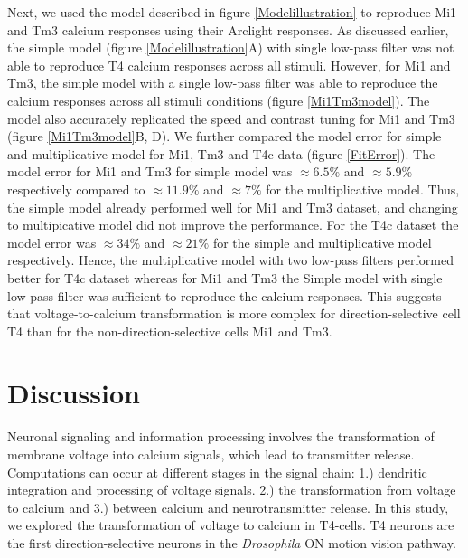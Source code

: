 \documentclass[9pt,lineno]{elife}
\begin{document}
Next, we used the model described in figure \ref{Modelillustration} to reproduce Mi1 and Tm3 calcium responses using their Arclight responses. As discussed earlier, the simple model (figure \ref{Modelillustration}A) with single low-pass filter was not able to reproduce T4 calcium responses across all stimuli. However, for Mi1 and Tm3, the simple model with a single low-pass filter was able to reproduce the calcium responses across all stimuli conditions (figure \ref{Mi1Tm3model}). The model also accurately replicated the speed and contrast tuning for Mi1 and Tm3 (figure \ref{Mi1Tm3model}B, D). We further compared the model error for simple and multiplicative model for Mi1, Tm3 and T4c data (figure \ref{FitError}). The model error for Mi1 and Tm3 for simple model was $\approx6.5\%$ and $\approx5.9\%$ respectively compared to $\approx11.9\%$ and $\approx7\%$ for the multiplicative model. Thus, the simple model already performed well for Mi1 and Tm3 dataset, and changing to multipicative model did not improve the performance. For the T4c dataset the model error was $\approx34\%$ and  $\approx21\%$ for the simple and multiplicative model respectively. Hence, the multiplicative model with two low-pass filters performed better for T4c dataset whereas for Mi1 and Tm3 the Simple model with single low-pass filter was sufficient to reproduce the calcium responses. This suggests that voltage-to-calcium transformation is more complex for direction-selective cell T4 than for the non-direction-selective cells Mi1 and Tm3.

\section{Discussion}
Neuronal signaling and information processing involves the transformation of membrane voltage into calcium signals, which lead to transmitter release. Computations can occur at different stages in the signal chain: 1.) dendritic integration and processing of voltage signals. 2.) the transformation from voltage to calcium and 3.) between calcium and neurotransmitter release. In this study, we explored the transformation of voltage to calcium in T4-cells. T4 neurons are the first direction-selective neurons in the \textit{Drosophila} ON motion vision pathway. %
\end{document}
